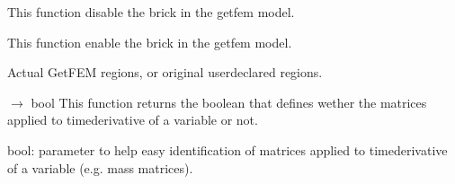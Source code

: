 \documentclass[letterpaper,10pt,english]{sphinxmanual}
\begin{document}
\begin{fulllineitems}
\begin{fulllineitems}
\label{\detokenize{scrimp:scrimp.brick.Brick.disable_id_bricks}}
\pysigstartsignatures
\pysiglinewithargsret
{}
{}
{}
\pysigstopsignatures
\sphinxAtStartPar
This function disable the brick in the getfem model.

\end{fulllineitems}


\begin{fulllineitems}
\label{\detokenize{scrimp:scrimp.brick.Brick.enable_id_bricks}}
\pysigstartsignatures
\pysiglinewithargsret
{}
{}
{}
\pysigstopsignatures
\sphinxAtStartPar
This function enable the brick in the getfem model.

\end{fulllineitems}


\begin{fulllineitems}
\label{\detokenize{scrimp:scrimp.brick.Brick.get_assembly_regions}}
\pysigstartsignatures
\pysiglinewithargsret
{}
{}
{}
\pysigstopsignatures
\sphinxAtStartPar
Actual GetFEM regions, or original user\sphinxhyphen{}declared regions.

\end{fulllineitems}


\begin{fulllineitems}
\label{\detokenize{scrimp:scrimp.brick.Brick.get_dt}}
\pysigstartsignatures
\pysiglinewithargsret
{}
{}
{{ $\rightarrow$ bool}}
\pysigstopsignatures
\sphinxAtStartPar
This function returns the boolean that defines wether the matrices applied to time\sphinxhyphen{}derivative of a variable or not.
\begin{description}
\sphinxAtStartPar
bool: parameter to help easy identification of matrices applied to time\sphinxhyphen{}derivative of a variable (e.g. mass matrices).


\end{description}
\end{fulllineitems}
\end{fulllineitems}
\end{document}
